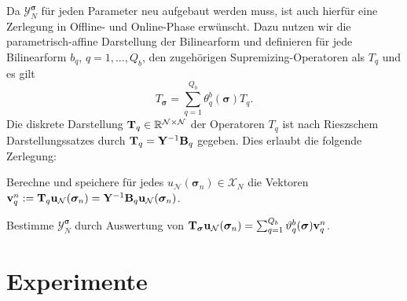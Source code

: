 \documentclass[../main.tex]{subfiles}
\begin{document}
Da $\mathcal Y_{N}^{\bm \sigma}$ für jeden Parameter neu aufgebaut werden muss, ist auch hierfür eine Zerlegung in Offline- und Online-Phase erwünscht.
Dazu nutzen wir die parametrisch-affine Darstellung der Bilinearform und definieren für jede Bilinearform $b_{q}$, $q = 1, \dots, Q_b$, den zugehörigen Supremizing-Operatoren als $T_{q}$ und es gilt
\begin{equation}
    T_{\bm \sigma} = \sum_{q = 1}^{Q_b} \theta_{q}^{b}(\bm \sigma) T_{q}.
\end{equation}
Die diskrete Darstellung $\mathbf{T}_{q} \in \mathbb{R}^{\mathcal N \times \mathcal N}$ der Operatoren $T_q$ ist nach Rieszschem Darstellungssatzes durch $\mathbf{T}_{q} = \mathbf{Y}^{-1} \mathbf{B}_{q}$ gegeben.
Dies erlaubt die folgende Zerlegung:

\begin{description}[font=\normalfont\itshape]
    \item[Offline:]Berechne und speichere für jedes $u_{\mathcal N}(\bm \sigma_{n}) \in \mathcal X_{N}$ die Vektoren $\mathbf{v}_{q}^{n} := \mathbf{T}_{q} \mathbf{u}_{\mathcal N}(\bm \sigma_{n}) = \mathbf{Y}^{-1} \mathbf{B}_{q} \mathbf{u}_{\mathcal N}(\bm \sigma_{n})$.
    \item[Online:] Bestimme $\mathcal Y_{N}^{\bm \sigma}$ durch Auswertung von $\mathbf{T}_{\bm \sigma} \mathbf{u}_{\mathcal N}(\bm \sigma_{n}) = \sum_{q = 1}^{Q_b} \vartheta_{q}^{b}(\bm \sigma) \mathbf{v}_{q}^{n}$.
\end{description}


\section{Experimente} %
\label{sec:experimente}


\end{document}

